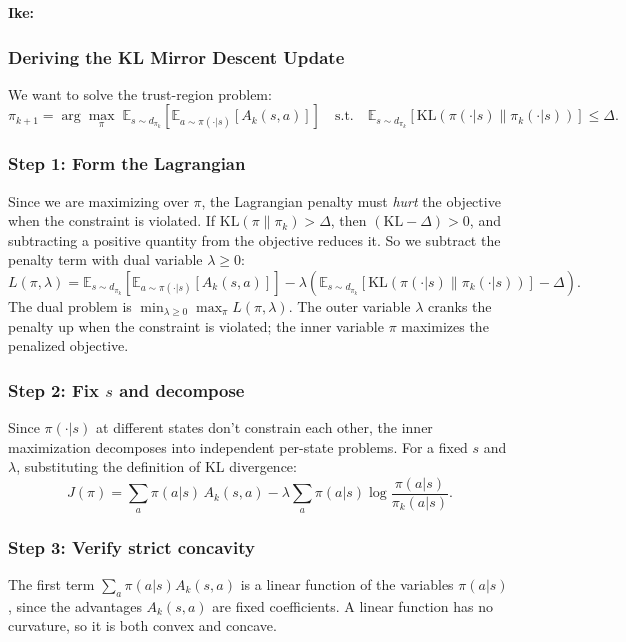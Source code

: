 \documentclass[11pt]{article}
\theoremstyle{definition}
\theoremstyle{remark}
\newenvironment{ike}{\color{blue}\textbf{Ike:}\\}{}
\begin{document}
\begin{ike}
    
\subsubsection*{Deriving the KL Mirror Descent Update}

We want to solve the trust-region problem:
\[
\pi_{k+1} = \arg\max_{\pi} \; \mathbb{E}_{s \sim d_{\pi_k}}\left[\mathbb{E}_{a \sim \pi(\cdot|s)}[A_k(s,a)]\right] \quad \text{s.t.} \quad \mathbb{E}_{s \sim d_{\pi_k}}[\mathrm{KL}(\pi(\cdot|s) \| \pi_k(\cdot|s))] \leq \Delta.
\]

\subsubsection*{Step 1: Form the Lagrangian}

Since we are maximizing over $\pi$, the Lagrangian penalty must \emph{hurt} the objective when the constraint is violated. If $\mathrm{KL}(\pi \| \pi_k) > \Delta$, then $(\mathrm{KL} - \Delta) > 0$, and subtracting a positive quantity from the objective reduces it. So we subtract the penalty term with dual variable $\lambda \geq 0$:
\[
L(\pi, \lambda) = \mathbb{E}_{s \sim d_{\pi_k}}\left[\mathbb{E}_{a \sim \pi(\cdot|s)}[A_k(s,a)]\right] - \lambda\left(\mathbb{E}_{s \sim d_{\pi_k}}[\mathrm{KL}(\pi(\cdot|s) \| \pi_k(\cdot|s))] - \Delta\right).
\]
The dual problem is $\min_{\lambda \geq 0} \max_{\pi} L(\pi, \lambda)$. The outer variable $\lambda$ cranks the penalty up when the constraint is violated; the inner variable $\pi$ maximizes the penalized objective.

\subsubsection*{Step 2: Fix $s$ and decompose}

Since $\pi(\cdot|s)$ at different states don't constrain each other, the inner maximization decomposes into independent per-state problems. For a fixed $s$ and $\lambda$, substituting the definition of KL divergence:
\[
J(\pi) = \sum_a \pi(a|s)\, A_k(s,a) - \lambda \sum_a \pi(a|s) \log \frac{\pi(a|s)}{\pi_k(a|s)}.
\]

\subsubsection*{Step 3: Verify strict concavity}

The first term $\sum_a \pi(a|s) A_k(s,a)$ is a linear function of the variables $\pi(a|s)$, since the advantages $A_k(s,a)$ are fixed coefficients. A linear function has no curvature, so it is both convex and concave.


\end{ike}
\end{document}
